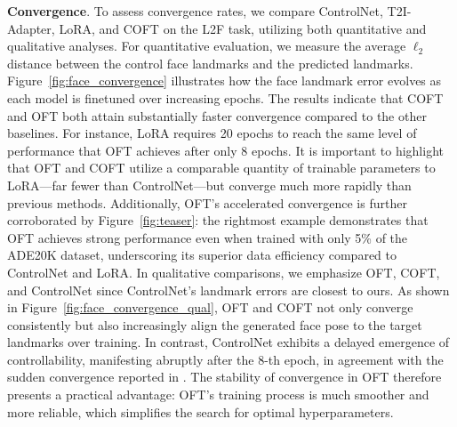 \textbf{Convergence}. To assess convergence rates, we compare ControlNet, T2I-Adapter, LoRA, and COFT on the L2F task, utilizing both quantitative and qualitative analyses. For quantitative evaluation, we measure the average $\ell_2$ distance between the control face landmarks and the predicted landmarks. Figure~\ref{fig:face_convergence} illustrates how the face landmark error evolves as each model is finetuned over increasing epochs. The results indicate that COFT and OFT both attain substantially faster convergence compared to the other baselines. For instance, LoRA requires 20 epochs to reach the same level of performance that OFT achieves after only 8 epochs. It is important to highlight that OFT and COFT utilize a comparable quantity of trainable parameters to LoRA—far fewer than ControlNet—but converge much more rapidly than previous methods. Additionally, OFT’s accelerated convergence is further corroborated by Figure~\ref{fig:teaser}: the rightmost example demonstrates that OFT achieves strong performance even when trained with only 5\% of the ADE20K dataset, underscoring its superior data efficiency compared to ControlNet and LoRA. In qualitative comparisons, we emphasize OFT, COFT, and ControlNet since ControlNet's landmark errors are closest to ours. As shown in Figure~\ref{fig:face_convergence_qual}, OFT and COFT not only converge consistently but also increasingly align the generated face pose to the target landmarks over training. In contrast, ControlNet exhibits a delayed emergence of controllability, manifesting abruptly after the 8-th epoch, in agreement with the sudden convergence reported in \cite{zhang2023adding}. The stability of convergence in OFT therefore presents a practical advantage: OFT's training process is much smoother and more reliable, which simplifies the search for optimal hyperparameters.

